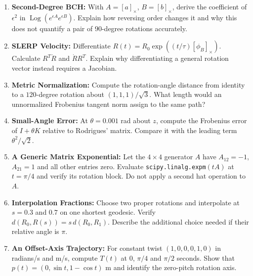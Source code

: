 \begin{enumerate}[itemsep=3pt,topsep=4pt]
\item \textbf{Second-Degree BCH:} With $A=[a]_\times$, $B=[b]_\times$, derive the coefficient of $\epsilon^2$ in $\operatorname{Log}(e^{\epsilon A}e^{\epsilon B})$. Explain how reversing order changes it and why this does not quantify a pair of $90$-degree rotations accurately.

\item \textbf{SLERP Velocity:} Differentiate $R(t)=R_0\exp((t/\tau)[\phi_B]_\times)$. Calculate $R^T\dot R$ and $\dot RR^T$. Explain why differentiating a general rotation vector instead requires a Jacobian.

\item \textbf{Metric Normalization:} Compute the rotation-angle distance from identity to a $120$-degree rotation about $(1,1,1)/\sqrt3$. What length would an unnormalized Frobenius tangent norm assign to the same path?

\item \textbf{Small-Angle Error:} At $\theta=0.001$ rad about $z$, compute the Frobenius error of $I+\theta K$ relative to Rodrigues' matrix. Compare it with the leading term $\theta^2/\sqrt2$.

\item \textbf{A Generic Matrix Exponential:} Let the $4\times4$ generator $A$ have $A_{12}=-1$, $A_{21}=1$ and all other entries zero. Evaluate \texttt{scipy.linalg.expm}$(tA)$ at $t=\pi/4$ and verify its rotation block. Do not apply a second hat operation to $A$.

\item \textbf{Interpolation Fractions:} Choose two proper rotations and interpolate at $s=0.3$ and $0.7$ on one shortest geodesic. Verify $d(R_0,R(s))=s\,d(R_0,R_1)$. Describe the additional choice needed if their relative angle is $\pi$.

\item \textbf{An Offset-Axis Trajectory:} For constant twist $(1,0,0,0,1,0)$ in radians/s and m/s, compute $T(t)$ at $0$, $\pi/4$ and $\pi/2$ seconds. Show that $p(t)=(0,\sin t,1-\cos t)$ m and identify the zero-pitch rotation axis.
\end{enumerate}
